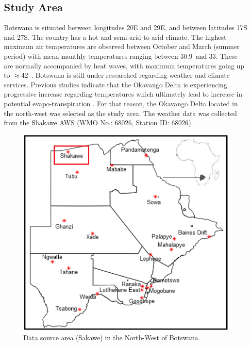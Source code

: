\documentclass[a4paper, 10pt, conference]{ieeeconf}      %
\begin{document}
	\subsection{Study Area}
\noindent
Botswana is situated between longitudes 20\textdegree E and 29\textdegree E, and between latitudes 17\textdegree S and 27\textdegree S. %
The country has a hot and semi-arid to arid climate. The highest maximum air temperatures are observed between October and March  (summer period) \cite{moses2017heat,ARCHER201722} with mean monthly  temperatures ranging between 30.9\textcelsius\ and 33\textcelsius. These are normally accompanied by heat waves, with maximum temperatures going up to $\approx$42\textcelsius\ \cite{moses2017heat}. 
Botswana is still under researched regarding weather and climate services. Previous studies \cite{kolawole2014ethno} indicate that the Okavango Delta is experiencing progressive increase regarding temperatures which ultimately lead to increase in potential evapo-transpiration \cite{moses2018effects}.   For that reason, the Okavango Delta located in the north-west was selected as the study area. The weather data was collected from the   Shakawe AWS (WMO No.: 68026, Station ID: 68026). %

\begin{figure}[h]
	\centering
	\includegraphics[width=1\columnwidth]{fig/Map20.png}
	\caption{Data source area (Sakawe) in the North-West of Botswana.}
	\label{Shakawe}
\end{figure}
\end{document}
